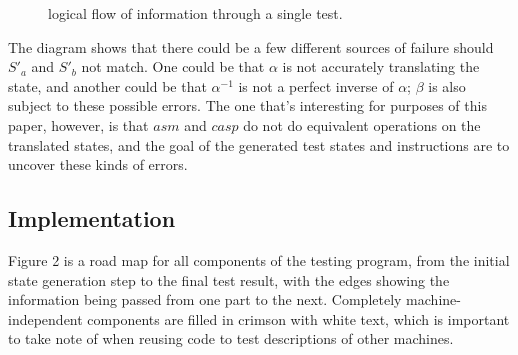 \documentclass[letterpaper,12pt]{article}
\begin{document}
\begin{figure}
\centering
{}
\caption{logical flow of information through a single test.} \label{fig:M1}
\end{figure}

The diagram shows that there could be a few different sources of failure should $S'_a$ and $S'_b$ not match. One could be that $\alpha$ is not accurately translating the state, and another could be that $\alpha^{-1}$ is not a perfect inverse of $\alpha$; $\beta$ is also subject to these possible errors. The one that's interesting for purposes of this paper, however, is that $asm$ and $casp$ do not do equivalent operations on the translated states, and the goal of the generated test states and instructions are to uncover these kinds of errors.

\subsection{Implementation}

Figure 2 is a road map for all components of the testing program, from the initial state generation step to the final test result, with the edges showing the information being passed from one part to the next. Completely machine-independent components are filled in crimson with white text, which is important to take note of when reusing code to test descriptions of other machines.
\end{document}
